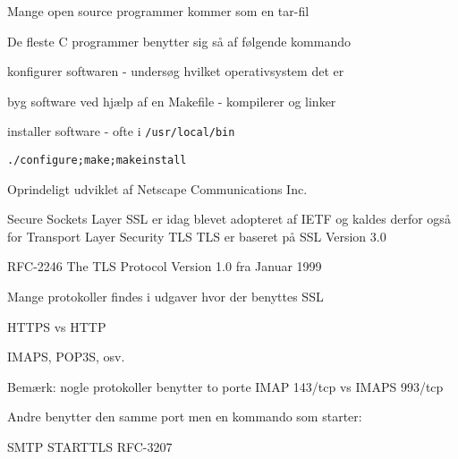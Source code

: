 \begin{list1}
\item Mange open source programmer kommer som en tar-fil  
\item De fleste C programmer benytter sig så af følgende kommando
\begin{list2}
\item konfigurer softwaren - undersøg hvilket operativsystem det er
\item byg software ved hjælp af en Makefile - kompilerer og linker
\item installer software - ofte i \verb+/usr/local/bin+    
\end{list2}
\end{list1}

\begin{alltt}
./configure;make;make install  
\end{alltt}



\begin{list1}
\item Oprindeligt udviklet af Netscape Communications Inc.
\item Secure Sockets Layer SSL er idag blevet adopteret af IETF og kaldes
derfor også for Transport Layer Security TLS
TLS er baseret på SSL Version 3.0
\item RFC-2246 The TLS Protocol Version 1.0 fra Januar 1999
\end{list1}


\begin{list1}
\item Mange protokoller findes i udgaver hvor der benyttes SSL
\item HTTPS vs HTTP
\item IMAPS, POP3S, osv.
\item Bemærk: nogle protokoller benytter to porte IMAP 143/tcp vs IMAPS 993/tcp
\item Andre benytter den samme port men en kommando som starter:
\item SMTP STARTTLS RFC-3207
\end{list1}



